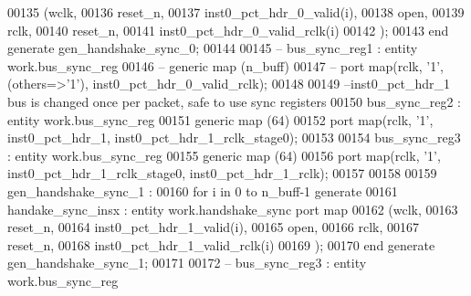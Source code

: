 \begin{DoxyCode}
00135          (wclk, 
00136          reset_n, 
00137          inst0_pct_hdr_0_valid\textcolor{vhdlchar}{(}i\textcolor{vhdlchar}{)}, 
00138          \textcolor{keywordflow}{open}, 
00139          rclk, 
00140          reset_n, 
00141          inst0_pct_hdr_0_valid_rclk\textcolor{vhdlchar}{(}i\textcolor{vhdlchar}{)}
00142       \textcolor{vhdlchar}{)};
00143   \textcolor{keywordflow}{end} \textcolor{keywordflow}{generate} \textcolor{vhdlchar}{gen\_handshake\_sync\_0};
00144   
00145 \textcolor{keyword}{-- bus\_sync\_reg1 : entity work.bus\_sync\_reg}
00146 \textcolor{keyword}{ -- generic map (n\_buff) }
00147 \textcolor{keyword}{-- port map(rclk, '1', (others=>'1'), inst0\_pct\_hdr\_0\_valid\_rclk);}
00148 
00149 \textcolor{keyword}{--inst0\_pct\_hdr\_1 bus is changed once per packet, safe to use sync registers }
00150  bus\_sync\_reg2 : \textcolor{keywordflow}{entity} work.bus_sync_reg
00151  \textcolor{keywordflow}{generic} \textcolor{keywordflow}{map} (\textcolor{vhdllogic}{64}\textcolor{vhdlchar}{)} 
00152  \textcolor{keywordflow}{port} \textcolor{keywordflow}{map}(rclk, '1', inst0_pct_hdr_1, inst0_pct_hdr_1_rclk_stage0\textcolor{vhdlchar}{)};
00153  
00154  bus\_sync\_reg3 : \textcolor{keywordflow}{entity} work.bus_sync_reg
00155  \textcolor{keywordflow}{generic} \textcolor{keywordflow}{map} (\textcolor{vhdllogic}{64}\textcolor{vhdlchar}{)} 
00156  \textcolor{keywordflow}{port} \textcolor{keywordflow}{map}(rclk, '1', inst0_pct_hdr_1_rclk_stage0, inst0_pct_hdr_1_rclk\textcolor{vhdlchar}{)};
00157  
00158  
00159   \textcolor{vhdlchar}{gen\_handshake\_sync\_1}  \textcolor{vhdlchar}{:} 
00160    \textcolor{keywordflow}{for} \textcolor{vhdlchar}{i} \textcolor{keywordflow}{in} \textcolor{vhdllogic}{}\textcolor{vhdllogic}{0} \textcolor{keywordflow}{to} \textcolor{vhdlchar}{n_buff}\textcolor{vhdlchar}{-}\textcolor{vhdllogic}{}\textcolor{vhdllogic}{1} \textcolor{keywordflow}{generate} 
00161       handake\_sync\_insx : \textcolor{keywordflow}{entity} work.handshake_sync \textcolor{keywordflow}{port} \textcolor{keywordflow}{map}
00162          (wclk, 
00163          reset_n, 
00164          inst0_pct_hdr_1_valid\textcolor{vhdlchar}{(}i\textcolor{vhdlchar}{)}, 
00165          \textcolor{keywordflow}{open}, 
00166          rclk, 
00167          reset_n, 
00168          inst0_pct_hdr_1_valid_rclk\textcolor{vhdlchar}{(}i\textcolor{vhdlchar}{)}
00169       \textcolor{vhdlchar}{)};
00170   \textcolor{keywordflow}{end} \textcolor{keywordflow}{generate} \textcolor{vhdlchar}{gen\_handshake\_sync\_1};
00171  
00172 \textcolor{keyword}{-- bus\_sync\_reg3 : entity work.bus\_sync\_reg}

\end{DoxyCode}
